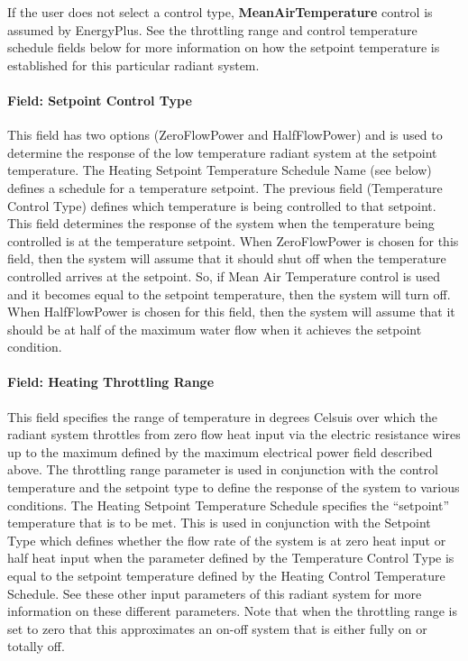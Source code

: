 If the user does not select a control type, \textbf{MeanAirTemperature} control is assumed by EnergyPlus. See the throttling range and control temperature schedule fields below for more information on how the setpoint temperature is established for this particular radiant system.

\paragraph{Field: Setpoint Control Type}\label{field-electric-radiant-system-setpoint-control-type}

This field has two options (ZeroFlowPower and HalfFlowPower) and is used to determine the response of the low temperature radiant system at the setpoint temperature.  The Heating Setpoint Temperature Schedule Name (see below) defines a schedule for a temperature setpoint.  The previous field (Temperature Control Type) defines which temperature is being controlled to that setpoint.  This field determines the response of the system when the temperature being controlled is at the temperature setpoint.  When ZeroFlowPower is chosen for this field, then the system will assume that it should shut off when the temperature controlled arrives at the setpoint.  So, if Mean Air Temperature control is used and it becomes equal to the setpoint temperature, then the system will turn off.  When HalfFlowPower is chosen for this field, then the system will assume that it should be at half of the maximum water flow when it achieves the setpoint condition.

\paragraph{Field: Heating Throttling Range}\label{field-heating-throttling-range}

This field specifies the range of temperature in degrees Celsuis over which the radiant system throttles from zero flow heat input via the electric resistance wires up to the maximum defined by the maximum electrical power field described above. The throttling range parameter is used in conjunction with the control temperature and the setpoint type to define the response of the system to various conditions. The Heating Setpoint Temperature Schedule specifies the ``setpoint'' temperature that is to be met.  This is used in conjunction with the Setpoint Type which defines whether the flow rate of the system is at zero heat input or half heat input when the parameter defined by the Temperature Control Type is equal to the setpoint temperature defined by the Heating Control Temperature Schedule.  See these other input parameters of this radiant system for more information on these different parameters.  Note that when the throttling range is set to zero that this approximates an on-off system that is either fully on or totally off.

